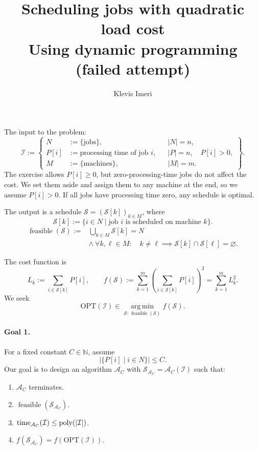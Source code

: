 \documentclass[12pt,a4paper]{article}
\title{Scheduling jobs with quadratic load cost\\[0.5em]\large Using dynamic programming (failed attempt)}
\author{Klevis Imeri}
\date{}
\begin{document}
\maketitle

The input to the problem:
\[
\mathcal{I} := \left\{
\begin{aligned}
N &:= \{\text{jobs}\}, && |N|=n,\\
P[i] &:= \text{processing time of job }i, && |P|=n,\quad P[i]>0,\\
M &:= \{\text{machines}\}, && |M|=m.
\end{aligned}
\right\}.
\]
The exercise allows $P[i]\geq0$, but zero-processing-time jobs do not
affect the cost. We set them aside and assign them to any machine at the
end, so we assume $P[i]>0$. If all jobs have processing time zero, any
schedule is optimal.

The output is a schedule $\mathcal{S}=(\mathcal{S}[k])_{k\in M}$, where
\[
\mathcal{S}[k] := \{i\in N\mid \text{job }i\text{ is scheduled on machine }k\}.
\]
\[
\begin{aligned}
\operatorname{feasible}(\mathcal{S}) := {}&
\bigcup_{k\in M}\mathcal{S}[k]=N\\
&\land\ \forall k,\ell\in M:\quad
k\neq\ell\implies\mathcal{S}[k]\cap\mathcal{S}[\ell]=\varnothing.
\end{aligned}
\]

The cost function is
\[
L_k := \sum_{i\in\mathcal{S}[k]}P[i],
\qquad
f(\mathcal{S}) := \sum_{k=1}^{m}\left(\sum_{i\in\mathcal{S}[k]}P[i]\right)^2
=\sum_{k=1}^{m}L_k^2.
\]
We seek
\[
\mathrm{OPT}(\mathcal{I})\in
\operatorname*{arg\,min}_{\mathcal{S}:\,\operatorname{feasible}(\mathcal{S})}
f(\mathcal{S}).
\]

\paragraph{Goal 1.}
For a fixed constant $C\in\mathbb{N}$, assume
\[
\bigl|\{P[i]\mid i\in N\}\bigr|\leq C.
\]
Our goal is to design an algorithm $\mathcal{A}_C$ with
$\mathcal{S}_{\mathcal{A}_C}=\mathcal{A}_C(\mathcal{I})$ such that:
\begin{enumerate}
\item $\mathcal{A}_C$ terminates.
\item $\operatorname{feasible}(\mathcal{S}_{\mathcal{A}_C})$.
\item $\operatorname{time}_{\mathcal{A}_C}(\mathcal{I})\leq\operatorname{poly}(|\mathcal{I}|)$.
\item $f(\mathcal{S}_{\mathcal{A}_C})=f(\mathrm{OPT}(\mathcal{I}))$.
\end{enumerate}
\end{document}

